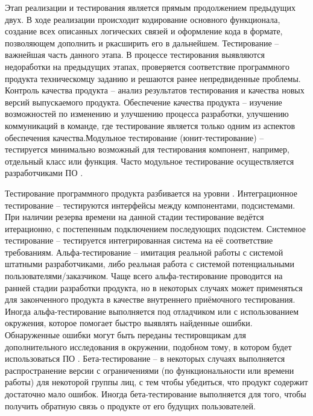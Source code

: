 Этап реализации и тестирования является прямым продолжением предыдущих двух. В ходе реализации происходит кодирование основного функционала, создание всех описанных логических связей и оформление кода в формате, позволяющем дополнить и ркасширить его в дальнейшем. Тестирование -- важнейшая часть данного этапа. В процессе тестирования выявляются недоработки на предыдущих этапах, проверяется соответствие программного продукта техническомцу заданию и решаются ранее непредвиденные проблемы. Контроль качества продукта -- анализ результатов тестирования и качества новых версий выпускаемого продукта. Обеспечение качества продукта -- изучение возможностей по изменению и улучшению процесса разработки, улучшению коммуникаций в команде, где тестирование является только одним из аспектов обеспечения качества.Модульное тестирование (юнит-тестирование) -- тестируется минимально возможный для тестирования компонент, например, отдельный класс или функция. Часто модульное тестирование осуществляется разработчиками ПО \cite{10, 12}.

Тестирование программного продукта разбивается на уровни \cite{2, 3}.
Интеграционное тестирование -- тестируются интерфейсы между компонентами, подсистемами. При наличии резерва времени на данной стадии тестирование ведётся итерационно, с постепенным подключением последующих подсистем.
Системное тестирование -- тестируется интегрированная система на её соответствие требованиям.
Альфа-тестирование -- имитация реальной работы с системой штатными разработчиками, либо реальная работа с системой потенциальными пользователями/заказчиком. Чаще всего альфа-тестирование проводится на ранней стадии разработки продукта, но в некоторых случаях может применяться для законченного продукта в качестве внутреннего приёмочного тестирования. Иногда альфа-тестирование выполняется под отладчиком или с использованием окружения, которое помогает быстро выявлять найденные ошибки. Обнаруженные ошибки могут быть переданы тестировщикам для дополнительного исследования в окружении, подобном тому, в котором будет использоваться ПО \cite{5, 7}.
Бета-тестирование -- в некоторых случаях выполняется распространение версии с ограничениями (по функциональности или времени работы) для некоторой группы лиц, с тем чтобы убедиться, что продукт содержит достаточно мало ошибок. Иногда бета-тестирование выполняется для того, чтобы получить обратную связь о продукте от его будущих пользователей.




